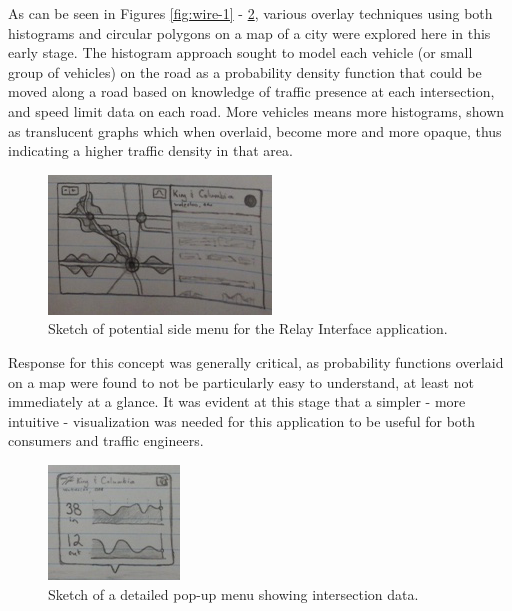 \documentclass{report}
\begin{document}
As can be seen in Figures \ref{fig:wire-1} - \ref{fig:wire-4}, various overlay techniques using both histograms and circular polygons on a map of a city were explored here in this early stage.
The histogram approach sought to model each vehicle (or small group of vehicles) on the road as a probability density function that could be moved along a road based on knowledge of traffic presence at each intersection, and speed limit data on each road.
More vehicles means more histograms, shown as translucent graphs which when overlaid, become more and more opaque, thus indicating a higher traffic density in that area.

\begin{figure}[htbp!]
  \begin{centering}
    \includegraphics[scale=1]{figures/wire-4.png}
    \caption{Sketch of potential side menu for the Relay Interface application.}
    \label{fig:wire-3}
  \end{centering}
\end{figure}

Response for this concept was generally critical, as probability functions overlaid on a map were found to not be particularly easy to understand, at least not immediately at a glance.
It was evident at this stage that a simpler - more intuitive - visualization was needed for this application to be useful for both consumers and traffic engineers.

\begin{figure}[htbp!]
  \begin{centering}
    \includegraphics[scale=1]{figures/wire-5.png}
    \caption{Sketch of a detailed pop-up menu showing intersection data.}
    \label{fig:wire-4}
  \end{centering}
\end{figure}
\end{document}
